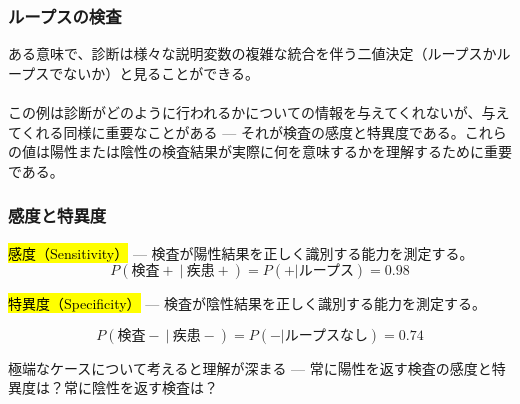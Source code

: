 
\begin{frame}
\frametitle{ループスの検査}

ある意味で、診断は様々な説明変数の複雑な統合を伴う二値決定（ループスかループスでないか）と見ることができる。\\
~\\
この例は診断がどのように行われるかについての情報を与えてくれないが、与えてくれる同様に重要なことがある --- それが検査の感度と特異度である。これらの値は陽性または陰性の検査結果が実際に何を意味するかを理解するために重要である。

\end{frame}


\begin{frame}
\frametitle{感度と特異度}

\hl{感度（Sensitivity）} --- 検査が陽性結果を正しく識別する能力を測定する。
\[P(\text{検査}+~|~\text{疾患}+) = P(+ | \text{ループス}) = 0.98\]

\hl{特異度（Specificity）} --- 検査が陰性結果を正しく識別する能力を測定する。

\[P(\text{検査}-~|~\text{疾患}-) = P(- | \text{ループスなし}) = 0.74\]

\vspace{1cm}

極端なケースについて考えると理解が深まる --- 常に陽性を返す検査の感度と特異度は？常に陰性を返す検査は？

\end{frame}


